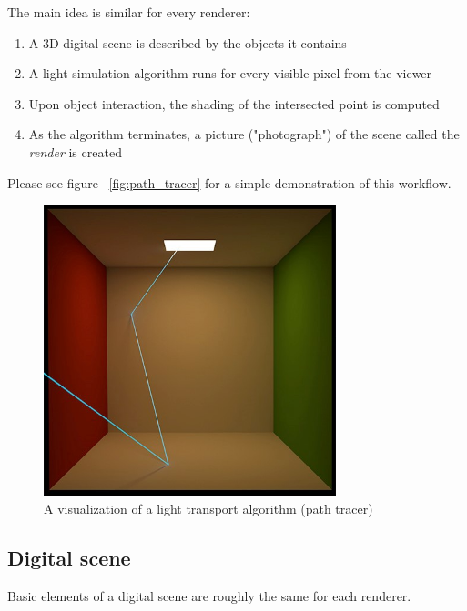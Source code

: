 The main idea is similar for every renderer:
\begin{enumerate}
	\item A 3D digital scene is described by the objects it contains
	\item A light simulation algorithm runs for every visible pixel from the viewer
	\item Upon object interaction, the shading of the intersected point is computed
	\item As the algorithm terminates, a picture ("photograph") of the scene called the \emph{render} is created
\end{enumerate}

Please see figure ~\autoref{fig:path_tracer} for a simple demonstration of this workflow.

\begin{figure}[h]
	\centering
	\includegraphics[width=85mm]{img/path_tracer.jpg}
	\caption{A visualization of a light transport algorithm (path tracer)~\cite{mitsubaWeb}}
	\label{fig:path_tracer}
\end{figure}

\subsection{Digital scene}

Basic elements of a digital scene are roughly the same for each renderer. 

